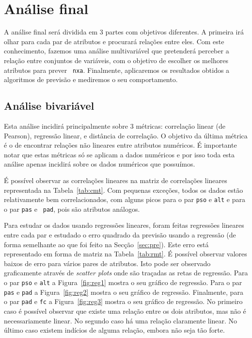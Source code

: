 \documentclass[10pt, conference, compsocconf]{IEEEtran}
\begin{document}

\section{Análise final}
\label{sec:afn}

A análise final será dividida em 3 partes com objetivos diferentes. A
primeira irá olhar para cada par de atributos e procurará relações
entre eles. Com este conhecimento, fazemos uma análise multivariável
que pretenderá perceber a relação entre conjuntos de variáveis, com o
objetivo de escolher os melhores atributos para prever {\tt
  nxa}. Finalmente, aplicaremos os resultados obtidos a algoritmos de
previsão e mediremos o seu comportamento.


\subsection{Análise bivariável}
Esta análise incidirá principalmente sobre 3 métricas: correlação
linear (de Pearson), regressão linear, e distância de correlação. O
objetivo da última métrica é o de encontrar relações não lineares
entre atributos numéricos. É importante notar que estas métricas só se
aplicam a dados numéricos e por isso toda esta análise apenas incidirá
sobre os dados numéricos que possuímos.

É possível observar as correlações lineares na matriz de correlações
lineares representada na Tabela~\ref{tab:cmt}. Com pequenas exceções,
todos os dados estão relativamente bem correlacionados, com alguns
picos para o par {\tt pso} e {\tt alt} e para o par {\tt pas} e {\tt
  pad}, pois são atributos análogos.

Para estudar os dados usando regressões lineares, foram feitas
regressões lineares entre cada par e estudado o erro quadrado da
previsão usando a regressão (de forma semelhante ao que foi feito na
Secção~\ref{sec:pre}). Este erro está representado em forma de matriz
na Tabela~\ref{tab:rmt}. É possível observar valores baixos de erro para
vários pares de atributos. Isto pode ser observado graficamente
através de \textit{scatter plots} onde são traçadas as retas de
regressão. Para o par {\tt pso} e {\tt alt} a Figura~\ref{fig:reg1}
mostra o seu gráfico de regressão. Para o par {\tt pas} e {\tt pad} a
Figura~\ref{fig:reg2} mostra o seu gráfico de regressão. Finalmente,
para o par {\tt pad} e {\tt fc} a Figura~\ref{fig:reg3} mostra o seu
gráfico de regressão. No primeiro caso é possível observar que existe
uma relação entre os dois atributos, mas não é necessariamente
linear. No segundo caso há uma relação claramente linear. No último
caso existem indícios de alguma relação, embora não seja tão forte.
\end{document}
